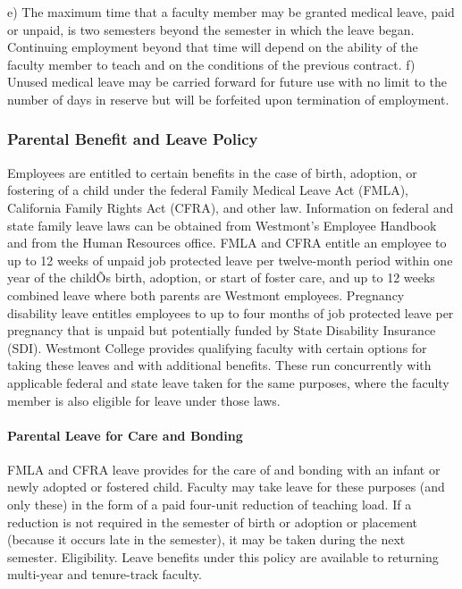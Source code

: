 \documentclass[letterpaper, 11pt]{article}
\begin{document}
			e) The maximum time that a faculty member may be granted medical leave, paid or unpaid, is two semesters beyond the semester in which the leave began.  Continuing employment beyond that time will depend on the ability of the faculty member to teach and on the conditions of the previous contract.
			f) Unused medical leave may be carried forward for future use with no limit to the number of days in reserve but will be forfeited upon termination of employment.

		\subsubsection{Parental Benefit and Leave Policy}
			Employees are entitled to certain benefits in the case of birth, adoption, or fostering of a child under the federal Family Medical Leave Act (FMLA), California Family Rights Act (CFRA), and other law. Information on federal and state family leave laws can be obtained from Westmont's Employee Handbook and from the Human Resources office. FMLA and CFRA entitle an employee to up to 12 weeks of unpaid job protected leave per twelve-month period within one year of the childÕs birth, adoption, or start of foster care, and up to 12 weeks combined leave where both parents are Westmont employees. Pregnancy disability leave entitles employees to up to four months of job protected leave per pregnancy that is unpaid but potentially funded by State Disability Insurance (SDI).
			Westmont College provides qualifying faculty with certain options for taking these leaves and with additional benefits. These run concurrently with applicable federal and state leave taken for the same purposes, where the faculty member is also eligible for leave under those laws.

			\paragraph{Parental Leave for Care and Bonding}
				FMLA and CFRA leave provides for the care of and bonding with an infant or newly adopted or fostered child. Faculty may take leave for these purposes (and only these) in the form of a paid four-unit reduction of teaching load. If a reduction is not required in the semester of birth or adoption or placement (because it occurs late in the semester), it may be taken during the next semester.
				Eligibility. Leave benefits under this policy are available to returning multi-year and tenure-track faculty.
\end{document}
